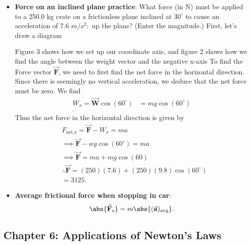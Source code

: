 \documentclass{report}
\begin{document}
\begin{itemize}
        \item \textbf{Force on an inclined plane practice}: What force (in N) must be applied to a 250.0 kg crate on a frictionless plane inclined at $30^{\circ}$ to cause an acceleration of 7.6 $m/s^{2}:$ up the plane? (Enter the magnitude.)
            \bigbreak \noindent 
            First, let's draw a diagram
            \bigbreak \noindent 
    \begin{figure}[ht]
        \centering
        \label{fig:dagz}
    \end{figure}
    \bigbreak \noindent 
    Figure 3 shows how we set up our coordinate axis, and figure 2 shows how we find the angle between the weight vector and the negative x-axis
    \bigbreak \noindent 
    To find the Force vector $\vec{\mathbf{F}}$, we need to first find the net force in the horizontal direction. Since there is seemingly no vertical acceleration, we deduce that the net force must be zero. We find 
    \begin{align*}
        W_{x} = \vec{\mathbf{W}}\cos{\left(60^{\circ}\right)} &= mg\cos{\left(60^{\circ}\right)} \\
    .\end{align*}
    Thus the net force in the horizontal direction is given by
    \begin{align*}
        &F_{\text{net,x}} = \vec{\mathbf{F}} - W_{x} = ma \\
        &\implies \vec{\mathbf{F}} - wg\cos{\left(60^{\circ}\right)} = ma \\
        &\implies \vec{\mathbf{F}} = ma + mg\cos{\left(60\right)} \\
        &\therefore \vec{\mathbf{F}} = (250)(7.6) + (250)(9.8)\cos{\left(60^{\circ}\right)} \\
        &=3125
    .\end{align*}
\item \textbf{Average frictional force when stopping in car}:
    \begin{align*}
        \abs{\vec{\mathbf{F}}_{s}} = m\abs{(\vec{\mathbf{a}})_{\text{avg}}}
    .\end{align*}

    \end{itemize}

    \pagebreak 
    \subsection{Chapter 6: Applications of Newton's Laws}
    \bigbreak \noindent 
\end{document}
